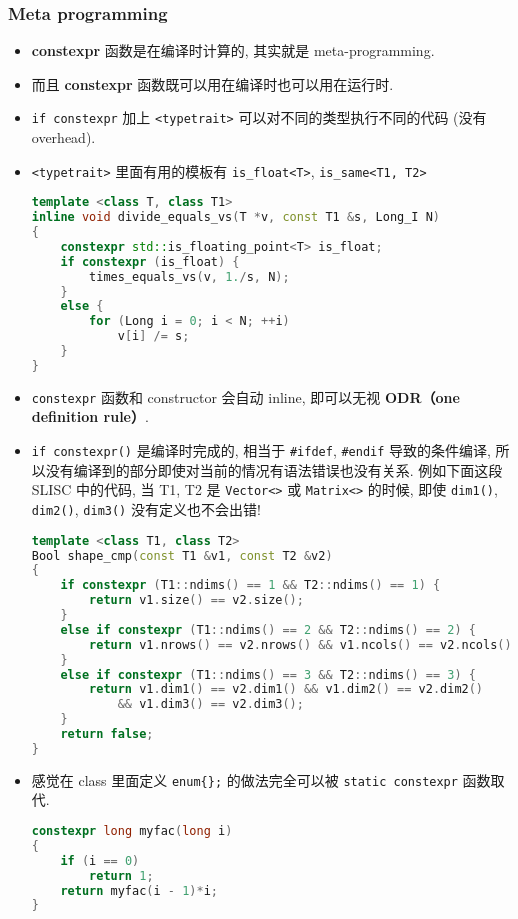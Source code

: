 \subsubsection{Meta programming}
\begin{itemize}
\item \textbf{constexpr} 函数是在编译时计算的, 其实就是 meta-programming.
\item 而且 \textbf{constexpr} 函数既可以用在编译时也可以用在运行时.
\item \verb`if constexpr` 加上 \verb`<typetrait>` 可以对不同的类型执行不同的代码 (没有 overhead).
\item \verb`<typetrait>` 里面有用的模板有 \verb`is_float<T>`, \verb`is_same<T1, T2>`
\begin{lstlisting}[language=cpp]
template <class T, class T1>
inline void divide_equals_vs(T *v, const T1 &s, Long_I N)
{
	constexpr std::is_floating_point<T> is_float;
	if constexpr (is_float) {
		times_equals_vs(v, 1./s, N);
	}
	else {
		for (Long i = 0; i < N; ++i)
			v[i] /= s;
	}
}
\end{lstlisting}
\item \verb`constexpr` 函数和 constructor 会自动 inline, 即可以无视 \textbf{ODR（one definition rule）}.
\item \verb`if constexpr()` 是编译时完成的, 相当于 \verb`#ifdef`, \verb`#endif` 导致的条件编译, 所以没有编译到的部分即使对当前的情况有语法错误也没有关系. 例如下面这段 SLISC 中的代码, 当 T1, T2 是 \verb`Vector<>` 或 \verb`Matrix<>` 的时候, 即使 \verb`dim1()`, \verb`dim2()`, \verb`dim3()` 没有定义也不会出错!
\begin{lstlisting}[language=cpp]
template <class T1, class T2>
Bool shape_cmp(const T1 &v1, const T2 &v2)
{
	if constexpr (T1::ndims() == 1 && T2::ndims() == 1) {
		return v1.size() == v2.size();
	}
	else if constexpr (T1::ndims() == 2 && T2::ndims() == 2) {
		return v1.nrows() == v2.nrows() && v1.ncols() == v2.ncols();
	}
	else if constexpr (T1::ndims() == 3 && T2::ndims() == 3) {
		return v1.dim1() == v2.dim1() && v1.dim2() == v2.dim2()
			&& v1.dim3() == v2.dim3();
	}
	return false;
}
\end{lstlisting}
\item 感觉在 class 里面定义 \verb`enum{};` 的做法完全可以被 \verb`static constexpr` 函数取代.
\begin{lstlisting}[language=cpp]
constexpr long myfac(long i)
{
	if (i == 0)
		return 1;
	return myfac(i - 1)*i;
}


\end{lstlisting}
\end{itemize}
